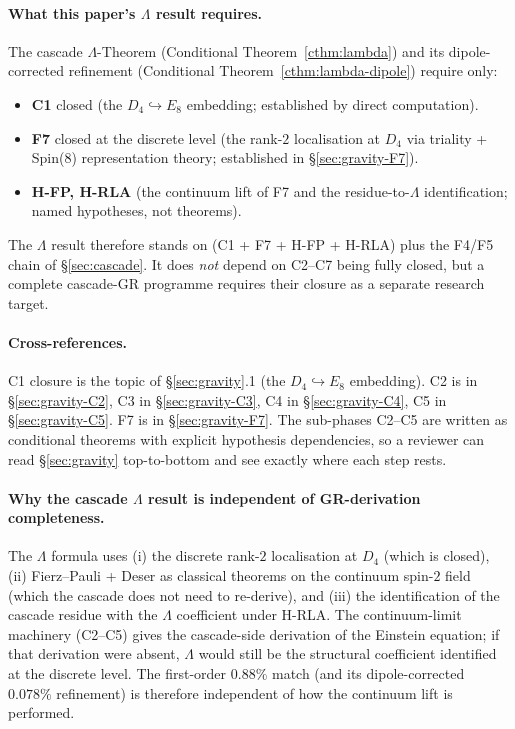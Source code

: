 \documentclass[11pt]{article}
\theoremstyle{plain}
\theoremstyle{definition}
\theoremstyle{remark}
\begin{document}
\paragraph{What this paper's $\Lambda$ result requires.} The cascade $\Lambda$-Theorem (Conditional Theorem~\ref{cthm:lambda}) and its dipole-corrected refinement (Conditional Theorem~\ref{cthm:lambda-dipole}) require only:
\begin{itemize}[leftmargin=2em]
\item \textbf{C1} closed (the $D_4 \hookrightarrow E_8$ embedding; established by direct computation).
\item \textbf{F7} closed at the discrete level (the rank-$2$ localisation at $D_4$ via triality + Spin(8) representation theory; established in \S\ref{sec:gravity-F7}).
\item \textbf{H-FP, H-RLA} (the continuum lift of F7 and the residue-to-$\Lambda$ identification; named hypotheses, not theorems).
\end{itemize}
The $\Lambda$ result therefore stands on (C1 + F7 + H-FP + H-RLA) plus the F4/F5 chain of \S\ref{sec:cascade}. It does \emph{not} depend on C2--C7 being fully closed, but a complete cascade-GR programme requires their closure as a separate research target.

\paragraph{Cross-references.} C1 closure is the topic of \S\ref{sec:gravity}.1 (the $D_4 \hookrightarrow E_8$ embedding). C2 is in \S\ref{sec:gravity-C2}, C3 in \S\ref{sec:gravity-C3}, C4 in \S\ref{sec:gravity-C4}, C5 in \S\ref{sec:gravity-C5}. F7 is in \S\ref{sec:gravity-F7}. The sub-phases C2--C5 are written as conditional theorems with explicit hypothesis dependencies, so a reviewer can read \S\ref{sec:gravity} top-to-bottom and see exactly where each step rests.

\paragraph{Why the cascade $\Lambda$ result is independent of GR-derivation completeness.} The $\Lambda$ formula uses (i) the discrete rank-$2$ localisation at $D_4$ (which is closed), (ii) Fierz--Pauli + Deser as classical theorems on the continuum spin-$2$ field (which the cascade does not need to re-derive), and (iii) the identification of the cascade residue with the $\Lambda$ coefficient under H-RLA. The continuum-limit machinery (C2--C5) gives the cascade-side derivation of the Einstein equation; if that derivation were absent, $\Lambda$ would still be the structural coefficient identified at the discrete level. The first-order $0.88\%$ match (and its dipole-corrected $0.078\%$ refinement) is therefore independent of how the continuum lift is performed.
\end{document}
